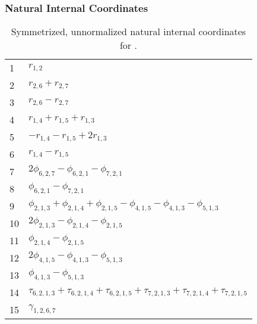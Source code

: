 \documentclass[10pt,oneside]{article}
\begin{document}
\clearpage

\subsubsection*{Natural Internal Coordinates}
\begin{table}[h!]
\centering
\caption{Symmetrized, unnormalized natural internal coordinates for .}
\small
\begin{tabular}{ll}
  1   & $r_{1,2}$ \\
  2   & $r_{2,6} + r_{2,7}$ \\
  3   & $r_{2,6} - r_{2,7}$ \\
  4   & $r_{1,4} + r_{1,5} + r_{1,3}$ \\
  5   & $-r_{1,4} - r_{1,5} + 2r_{1,3}$ \\
  6   & $r_{1,4} - r_{1,5}$ \\
  7   & $2\phi_{6,2,7} - \phi_{6,2,1} - \phi_{7,2,1}$ \\
  8   & $\phi_{6,2,1} - \phi_{7,2,1}$ \\
  9   & $\phi_{2,1,3} + \phi_{2,1,4} + \phi_{2,1,5} - \phi_{4,1,5} - \phi_{4,1,3} - \phi_{5,1,3}$ \\
  10  & $2\phi_{2,1,3} - \phi_{2,1,4} - \phi_{2,1,5}$ \\
  11  & $\phi_{2,1,4} - \phi_{2,1,5}$ \\
  12  & $2\phi_{4,1,5} - \phi_{4,1,3} - \phi_{5,1,3}$ \\
  13  & $\phi_{4,1,3} - \phi_{5,1,3}$ \\
  14  & $\tau_{6,2,1,3} + \tau_{6,2,1,4} + \tau_{6,2,1,5} + \tau_{7,2,1,3} + \tau_{7,2,1,4} + \tau_{7,2,1,5}$ \\
  15  & $\gamma_{1,2,6,7}$ \\
\end{tabular}
\end{table}

\clearpage

\subsection{\ \ \ }
\end{document}
